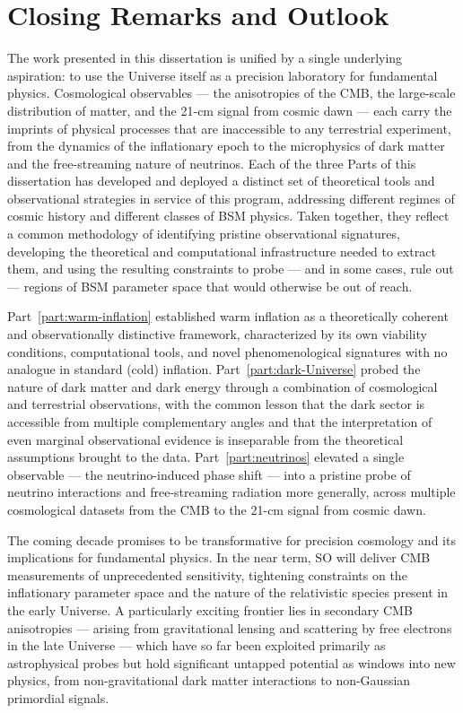 \chapter{Closing Remarks and Outlook}
\label{ch:conclusions}


The work presented in this dissertation is unified by a single underlying aspiration: to use the Universe itself as a precision laboratory for fundamental physics. Cosmological observables --- the anisotropies of the CMB, the large-scale distribution of matter, and the 21-cm signal from cosmic dawn --- each carry the imprints of physical processes that are inaccessible to any terrestrial experiment, from the dynamics of the inflationary epoch to the microphysics of dark matter and the free-streaming nature of neutrinos. Each of the three Parts of this dissertation has developed and deployed a distinct set of theoretical tools and observational strategies in service of this program, addressing different regimes of cosmic history and different classes of BSM physics. Taken together, they reflect a common methodology of identifying pristine observational signatures, developing the theoretical and computational infrastructure needed to extract them, and using the resulting constraints to probe --- and in some cases, rule out --- regions of BSM parameter space that would otherwise be out of reach.

\medskip

Part~\ref{part:warm-inflation} established warm inflation as a theoretically coherent and observationally distinctive framework, characterized by its own viability conditions, computational tools, and novel phenomenological signatures with no analogue in standard (cold) inflation. Part~\ref{part:dark-Universe} probed the nature of dark matter and dark energy through a combination of cosmological and terrestrial observations, with the common lesson that the dark sector is accessible from multiple complementary angles and that the interpretation of even marginal observational evidence is inseparable from the theoretical assumptions brought to the data. Part~\ref{part:neutrinos} elevated a single observable --- the neutrino-induced phase shift --- into a pristine probe of neutrino interactions and free-streaming radiation more generally, across multiple cosmological datasets from the CMB to the 21-cm signal from cosmic dawn.


\medskip

The coming decade promises to be transformative for precision cosmology and its implications for fundamental physics. In the near term, SO will deliver CMB measurements of unprecedented sensitivity, tightening constraints on the inflationary parameter space and the nature of the relativistic species present in the early Universe. A particularly exciting frontier lies in secondary CMB anisotropies --- arising from gravitational lensing and scattering by free electrons in the late Universe --- which have so far been exploited primarily as astrophysical probes but hold significant untapped potential as windows into new physics, from non-gravitational dark matter interactions to non-Gaussian primordial signals. 

